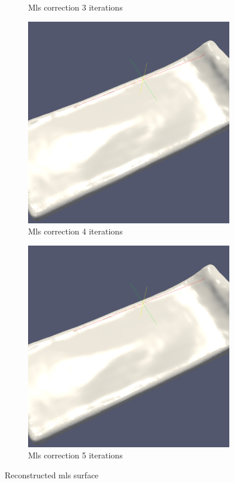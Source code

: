 \begin{figure}
\begin{center}
\begin{subfigure}[b]{0.47\textwidth}
			\caption{Mls correction 3 iterations}
		\end{subfigure}
		\begin{subfigure}[b]{0.47\textwidth}
			\includegraphics[width=\textwidth]{figures/Mls2Surface4Iteration.png}
			\caption{Mls correction 4 iterations}
		\end{subfigure}
		\begin{subfigure}[b]{0.47\textwidth}
			\includegraphics[width=\textwidth]{figures/Mls2Surface5Iteration.png}
			\caption{Mls correction 5 iterations}
		\end{subfigure}
	\end{center}
	\caption{Reconstructed mls surface} 
	\label{fig:mls_surf_iter_examples2}
\end{figure}

